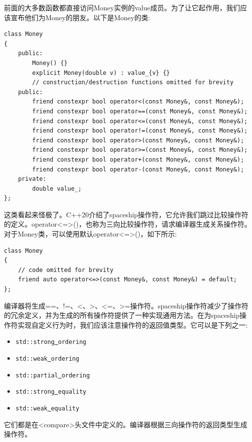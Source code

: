 前面的大多数函数都直接访问Money实例的value成员。为了让它起作用，我们应该宣布他们为Money的朋友。以下是Money的类: \par

\begin{lstlisting}[caption={}]
class Money
{
	public:
		Money() {}
		explicit Money(double v) : value_{v} {}
		// construction/destruction functions omitted for brevity
	public:
		friend constexpr bool operator<(const Money&, const Money&);
		friend constexpr bool operator==(const Money&, const Money&);
		friend constexpr bool operator<=(const Money&, const Money&);
		friend constexpr bool operator!=(const Money&, const Money&);
		friend constexpr bool operator>(const Money&, const Money&);
		friend constexpr bool operator>=(const Money&, const Money&);
		friend constexpr bool operator+(const Money&, const Money&);
		friend constexpr bool operator-(const Money&, const Money&);
	private:
		double value_;
};
\end{lstlisting}

这类看起来怪极了。C++20介绍了spaceship操作符，它允许我们跳过比较操作符的定义。operator<=>()，也称为三向比较操作符，请求编译器生成关系操作符。对于Money类，可以使用默认operator<=>()，如下所示: \par

\begin{lstlisting}[caption={}]
class Money
{
	// code omitted for brevity
	friend auto operator<=>(const Money&, const Money&) = default;
};
\end{lstlisting}

编译器将生成==、!=、<、>、<=、>=操作符。spaceship操作符减少了操作符的冗余定义，并为生成的所有操作符提供了一种实现通用方法。在为spaceship操作符实现自定义行为时，我们应该注意操作符的返回值类型。它可以是下列之一: \par

\begin{itemize}
	\item \texttt{std::strong\underline{ }ordering}
	\item \texttt{std::weak\underline{ }ordering}
	\item \texttt{std::partial\underline{ }ordering}
	\item \texttt{std::strong\underline{ }equality}
	\item \texttt{std::weak\underline{ }equality}
\end{itemize}

它们都是在<compare>头文件中定义的。编译器根据三向操作符的返回类型生成操作符。\par

